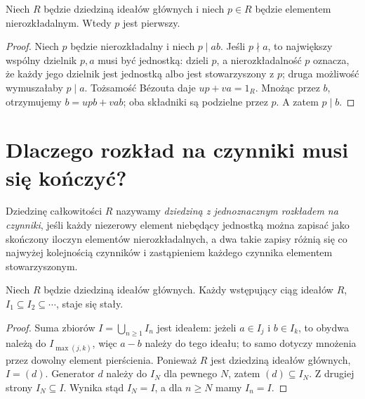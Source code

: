 \begin{wniosek}
\label{aa:wn:irred-is-prime-pid}
Niech $R$ będzie dziedziną ideałów głównych i niech
$p\in R$ będzie elementem nierozkładalnym. Wtedy $p$ jest pierwszy.
\end{wniosek}
\begin{proof}
Niech $p$ będzie nierozkładalny i niech $p\mid ab$.
Jeśli $p\nmid a$, to największy wspólny dzielnik $p,a$
musi być jednostką: dzieli $p$, a nierozkładalność $p$
oznacza, że każdy jego dzielnik jest jednostką albo jest
stowarzyszony z $p$; druga możliwość wymuszałaby $p\mid a$.
Tożsamość Bézouta daje $up+va=1_R$.
Mnożąc przez $b$, otrzymujemy $b=upb+vab$;
oba składniki są podzielne przez $p$. A zatem $p\mid b$.
\end{proof}

\section{Dlaczego rozkład na czynniki musi się kończyć?}
\begin{definicja}
\label{aa:def:ufd}
Dziedzinę całkowitości $R$ nazywamy
\emph{dziedziną z jednoznacznym rozkładem na czynniki},
jeśli każdy niezerowy element niebędący jednostką można
zapisać jako skończony iloczyn elementów nierozkładalnych,
a dwa takie zapisy różnią się co najwyżej kolejnością
czynników i zastąpieniem każdego czynnika elementem stowarzyszonym.
\end{definicja}

\begin{lemat}
\label{aa:lem:pid-ascending-chain}
Niech $R$ będzie dziedziną ideałów głównych.
Każdy wstępujący ciąg ideałów $R$,
$I_1\subseteq I_2\subseteq\cdots$, staje się stały.
\end{lemat}
\begin{proof}
Suma zbiorów $I=\bigcup_{n\ge1}I_n$ jest ideałem:
jeżeli $a\in I_j$ i $b\in I_k$, to obydwa należą
do $I_{\max(j,k)}$, więc $a-b$ należy do tego ideału;
to samo dotyczy mnożenia przez dowolny element pierścienia.
Ponieważ $R$ jest dziedziną ideałów głównych, $I=(d)$.
Generator $d$ należy do $I_N$ dla pewnego $N$,
zatem $(d)\subseteq I_N$. Z drugiej strony $I_N\subseteq I$.
Wynika stąd $I_N=I$, a dla $n\ge N$ mamy $I_n=I$.
\end{proof}

